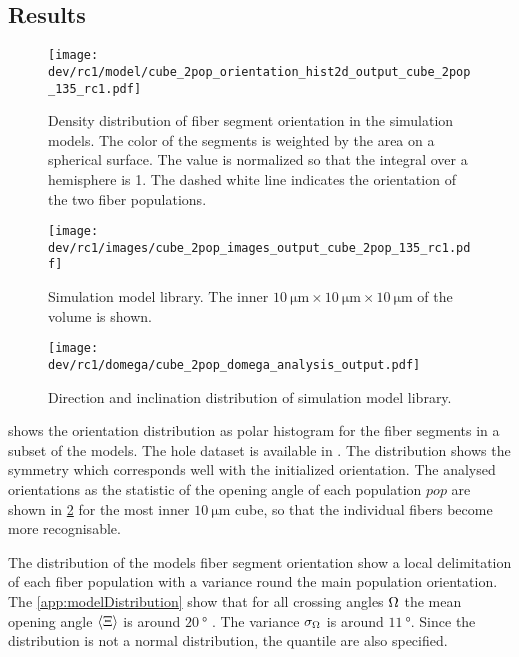 \subsection{Results}
%
%
\begin{figure}[!t]
\centering
\texttt{[image: dev/rc1/model/cube\_2pop\_orientation\_hist2d\_output\_cube\_2pop\_135\_rc1.pdf]}
\caption{Density distribution of fiber segment orientation in the simulation models. The color of the segments is weighted by the area on a spherical surface. The value is normalized so that the integral over a hemisphere is 1. The dashed white line indicates the orientation of the two fiber populations.}
\label{fig:modelOrientation}
\end{figure}
%
\begin{figure}[!t]
\centering
\texttt{[image: dev/rc1/images/cube\_2pop\_images\_output\_cube\_2pop\_135\_rc1.pdf]}
\caption[solved model images]{Simulation model library. The inner $\SI{10}{\micro\meter} \times \SI{10}{\micro\meter} \times \SI{10}{\micro\meter}$ of the volume is shown.}
\label{fig:modelImages}
\end{figure}
%
%
\begin{figure}[!t]
    \centering
    \texttt{[image: dev/rc1/domega/cube\_2pop\_domega\_analysis\_output.pdf]}
    \caption{Direction and inclination distribution of simulation model library. }
\end{figure}
%
%
%
 shows the orientation distribution as polar histogram for the fiber segments in a subset of the models.
The hole dataset is available in .
The distribution shows the symmetry which corresponds well with the initialized orientation.
The analysed orientations as the statistic of the opening angle of each population $pop$ are shown in \cref{fig:modelImages} for the most inner $\SI{10}{\micro\meter}$ cube, so that the individual fibers become more recognisable.
\par
%
The distribution of the models fiber segment orientation show a local delimitation of each fiber population with a variance round the main population orientation.
The \cref{app:modelDistribution} show that for all crossing angles $\textnormal{$\Omega$}$ the mean opening angle $\langle \textnormal{$\Xi$}
 \rangle$ is around $\SI{20}{\degree}$ .
The variance $\sigma_{\textnormal{$\Omega$}}$ is around $\SI{11}{\degree}$.
Since the distribution is not a normal distribution, the quantile are also specified.
